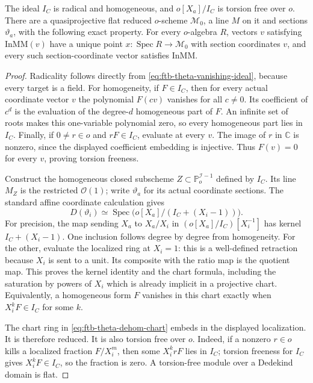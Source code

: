 \begin{srlemma}
\label{lem:ftb-theta-mm-pre}
The ideal \(I_C\) is radical and homogeneous, and
\(o[X_a]/I_C\) is torsion free over \(o\).
There are a quasiprojective flat reduced \(o\)-scheme
\(\mathcal M_0\), a line \(M\) on it and sections
\(\vartheta_a\), with the following exact property.
For every \(o\)-algebra \(R\), vectors \(v\) satisfying
\(\mathrm{InMM}(v)\) have a unique point
\(x:\operatorname{Spec}R\to\mathcal M_0\) with section
coordinates \(v\), and every such section-coordinate
vector satisfies \(\mathrm{InMM}\).
\end{srlemma}
\begin{proof}
Radicality follows directly from
\eqref{eq:ftb-theta-vanishing-ideal}, because every target
is a field.
For homogeneity, if \(F\in I_C\), then for every actual
coordinate vector \(v\) the polynomial \(F(cv)\) vanishes
for all \(c\ne0\).
Its coefficient of \(c^d\) is the evaluation of the
degree-\(d\) homogeneous part of \(F\).
An infinite set of roots makes this one-variable
polynomial zero, so every homogeneous part lies in
\(I_C\).
Finally, if \(0\ne r\in o\) and \(rF\in I_C\), evaluate
at every \(v\).
The image of \(r\) in \(\mathbb C\) is nonzero, since the
displayed coefficient embedding is injective.
Thus \(F(v)=0\) for every \(v\), proving torsion freeness.

Construct the homogeneous closed subscheme
\(Z\subset\mathbb P_o^{\mathcal I-1}\) defined by \(I_C\).
Its line \(M_Z\) is the restricted \(\mathcal O(1)\);
write \(\vartheta_a\) for its actual coordinate sections.
The standard affine coordinate calculation gives
\[
 D(\vartheta_i)\simeq
 \operatorname{Spec}
  \bigl(o[X_a]/(I_C+(X_i-1))\bigr).
 \tag{M4}\label{eq:ftb-theta-dehom-chart}
\]
For precision, the map sending \(X_a\) to \(X_a/X_i\) in
\((o[X_a]/I_C)[X_i^{-1}]\) has kernel
\(I_C+(X_i-1)\).
One inclusion follows degree by degree from homogeneity.
For the other, evaluate the localized ring at \(X_i=1\):
this is a well-defined retraction because \(X_i\) is
sent to a unit.
Its composite with the ratio map is the quotient map.
This proves the kernel identity and the chart formula,
including the saturation by powers of \(X_i\) which is
already implicit in a projective chart.
Equivalently, a homogeneous form \(F\) vanishes in this
chart exactly when \(X_i^kF\in I_C\) for some \(k\).

The chart ring in \eqref{eq:ftb-theta-dehom-chart} embeds
in the displayed localization.
It is therefore reduced.
It is also torsion free over \(o\).
Indeed, if a nonzero \(r\in o\) kills a localized fraction
\(F/X_i^m\), then some \(X_i^krF\) lies in \(I_C\);
torsion freeness for \(I_C\) gives \(X_i^kF\in I_C\),
so the fraction is zero.
A torsion-free module over a Dedekind domain is flat.


\end{proof}
